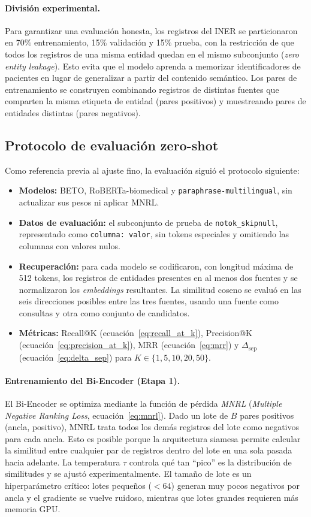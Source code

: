 \paragraph{División experimental.}
Para garantizar una evaluación honesta, los registros del INER se particionaron en 70\% entrenamiento, 15\% validación y 15\% prueba, con la restricción de que todos los registros de una misma entidad quedan en el mismo subconjunto (\textit{zero entity leakage}). Esto evita que el modelo aprenda a memorizar identificadores de pacientes en lugar de generalizar a partir del contenido semántico. Los pares de entrenamiento se construyen combinando registros de distintas fuentes que comparten la misma etiqueta de entidad (pares positivos) y muestreando pares de entidades distintas (pares negativos).

\subsection{Protocolo de evaluación zero-shot}
Como referencia previa al ajuste fino, la evaluación siguió el protocolo siguiente:
\begin{itemize}
    \item \textbf{Modelos:} BETO, RoBERTa-biomedical y \texttt{paraphrase-multilingual}, sin actualizar sus pesos ni aplicar MNRL.
    \item \textbf{Datos de evaluación:} el subconjunto de prueba de \texttt{notok\_skipnull}, representado como \texttt{columna: valor}, sin tokens especiales y omitiendo las columnas con valores nulos.
    \item \textbf{Recuperación:} para cada modelo se codificaron, con longitud máxima de 512 tokens, los registros de entidades presentes en al menos dos fuentes y se normalizaron los \textit{embeddings} resultantes. La similitud coseno se evaluó en las seis direcciones posibles entre las tres fuentes, usando una fuente como consultas y otra como conjunto de candidatos.
    \item \textbf{Métricas:} Recall@K (ecuación~\ref{eq:recall_at_k}), Precision@K (ecuación~\ref{eq:precision_at_k}), MRR (ecuación~\ref{eq:mrr}) y $\Delta_{\mathrm{sep}}$ (ecuación~\ref{eq:delta_sep}) para $K \in \{1, 5, 10, 20, 50\}$.
\end{itemize}

\paragraph{Entrenamiento del Bi-Encoder (Etapa 1).}
El Bi-Encoder se optimiza mediante la función de pérdida \textit{MNRL} (\textit{Multiple Negative Ranking Loss}, ecuación~\ref{eq:mnrl}). Dado un lote de $B$ pares positivos (ancla, positivo), MNRL trata todos los demás registros del lote como negativos para cada ancla. Esto es posible porque la arquitectura siamesa permite calcular la similitud entre cualquier par de registros dentro del lote en una sola pasada hacia adelante. La temperatura $\tau$ controla qué tan ``pico'' es la distribución de similitudes y se ajustó experimentalmente. El tamaño de lote es un hiperparámetro crítico: lotes pequeños ($< 64$) generan muy pocos negativos por ancla y el gradiente se vuelve ruidoso, mientras que lotes grandes requieren más memoria GPU.

